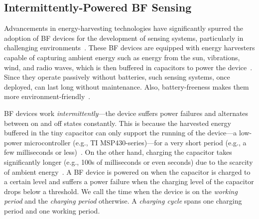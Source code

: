 \documentclass[lettersize,journal]{IEEEtran}
\begin{document}
\subsection{Intermittently-Powered BF Sensing}
\label{sec:motivation:sensing}
Advancements in energy-harvesting technologies have significantly spurred the adoption of BF devices for the development of sensing systems, particularly in challenging environments~\cite{2017-snapl-survey,2019-asplos-genesis,2021-weee-cic,2020-ipsn-cis,2020-sensys-bfsensing}. These BF devices are equipped with energy harvesters capable of capturing ambient energy such as energy from the sun, vibrations, wind, and radio waves, which is then buffered in capacitors to power the device~\cite{2018-asplos-energystore}. Since they operate passively without batteries, such sensing systems, once deployed, can last long without maintenance. Also, battery-freeness makes them more environment-friendly~\cite{2017-snapl-survey}.

BF devices work \emph{intermittently}---the device suffers power failures and alternates between on and off states constantly. This is because the harvested energy buffered in the tiny capacitor can only support the running of the device---a low-power microcontroller (e.g., TI MSP430-series)---for a very short period (e.g., a few milliseconds or less)~\cite{2022-tecs-energyconsumption}. On the other hand, charging the capacitor takes significantly longer (e.g., 100s of milliseconds or even seconds) due to the scarcity of ambient energy~\cite{2022-nsdi-bonito}. A BF device is powered on when the capacitor is charged to a certain level and suffers a power failure when the charging level of the capacitor drops below a threshold. We call the time when the device is on the \emph{working period} and the \emph{charging period} otherwise. A \emph{charging cycle} spans one charging period and one working period. 
\end{document}

